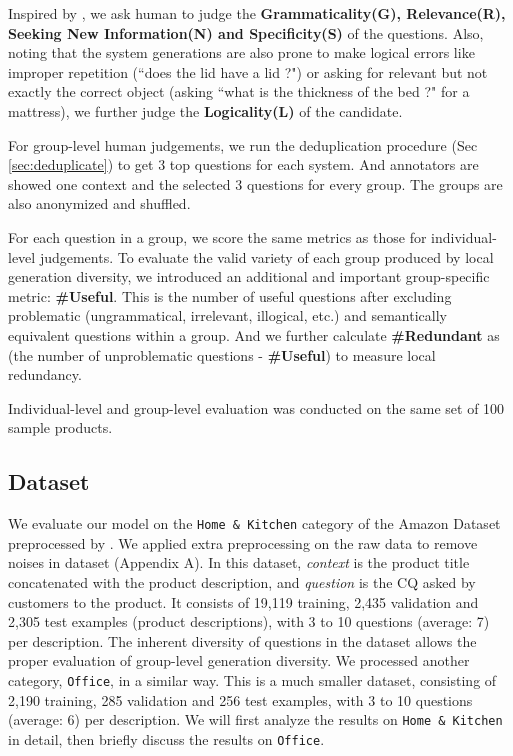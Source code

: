 Inspired by \citet{rao2019answer}, we ask human to judge the \textbf{Grammaticality(G), Relevance(R), Seeking New Information(N) and Specificity(S)} of the questions. Also, noting that the system generations are also prone to make logical errors like improper repetition (``does the lid have a lid ?") or asking for relevant but not exactly the correct object (asking ``what is the thickness of the bed ?" for a mattress), we further judge the \textbf{Logicality(L)} of the candidate.

For group-level human judgements, we run the deduplication procedure (Sec \ref{sec:deduplicate}) to get 3 top questions for each system. And annotators are showed one context and the selected 3 questions for every group. The groups are also anonymized and shuffled.

For each question in a group, we score the same metrics as those for individual-level judgements. To evaluate the valid variety of each group produced by local generation diversity, we introduced an additional and important group-specific metric: \textbf{\#Useful}. This is the number of useful questions after excluding problematic (ungrammatical, irrelevant, illogical, etc.) and semantically equivalent questions within a group. And we further calculate \textbf{\#Redundant} as (the number of unproblematic questions - \textbf{\#Useful}) to measure local redundancy.

Individual-level and group-level evaluation was conducted on the same set of 100 sample products.

\subsection{Dataset}
We evaluate our model on the \texttt{Home \& Kitchen} category of the Amazon Dataset preprocessed by \citet{rao2019answer}. We applied extra preprocessing on the raw data to remove noises in dataset (Appendix A). In this dataset, \textit{context} is the product title concatenated with the product description, and \textit{question} is the CQ asked by customers to the product. It consists of 19,119 training, 2,435 validation and 2,305 test examples (product descriptions), with 3 to 10 questions (average: 7) per description. The inherent diversity of questions in the dataset allows the proper evaluation of group-level generation diversity. We processed another category, \texttt{Office}, in a similar way. This is a much smaller dataset, consisting of 2,190 training, 285 validation and 256 test examples, with 3 to 10 questions (average: 6) per description. We will first analyze the results on \texttt{Home \& Kitchen} in detail, then briefly discuss the results on \texttt{Office}.

